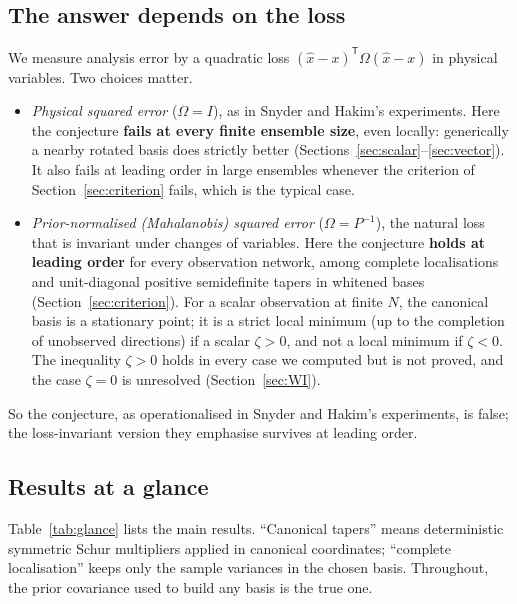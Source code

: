 \documentclass[11pt,a4paper]{article}
\numberwithin{equation}{section}
\theoremstyle{remark}\newtheorem{remark}[theorem]{Remark}
\newcommand{\T}{^{\mathsf T}}
\begin{document}
\subsection{The answer depends on the loss}\label{sec:losses}

We measure analysis error by a quadratic loss \((\hat x-x)\T\Omega(\hat x-x)\) in physical
variables. Two choices matter.
\begin{itemize}
\item \emph{Physical squared error} (\(\Omega=I\)), as in Snyder and Hakim's experiments. Here the
 conjecture \textbf{fails at every finite ensemble size}, even locally: generically a nearby
 rotated basis does strictly better (Sections~\ref{sec:scalar}--\ref{sec:vector}). It also
 fails at leading order in large ensembles whenever the criterion of
 Section~\ref{sec:criterion} fails, which is the typical case.
\item \emph{Prior-normalised (Mahalanobis) squared error} (\(\Omega=P^{-1}\)), the natural
 loss that is invariant under changes of variables. Here the conjecture \textbf{holds at
 leading order} for every observation network, among complete localisations and
 unit-diagonal positive semidefinite tapers in whitened bases (Section~\ref{sec:criterion}).
 For a scalar observation at finite \(N\), the canonical basis is a stationary point; it is a
 strict local minimum (up to the completion of unobserved directions) if a scalar
 \(\zeta>0\), and not a local minimum if \(\zeta<0\). The inequality \(\zeta>0\) holds in every
 case we computed but is not proved, and the case \(\zeta=0\) is unresolved
 (Section~\ref{sec:WI}).
\end{itemize}
So the conjecture, as operationalised in Snyder and Hakim's experiments, is false; the
loss-invariant version they emphasise survives at leading order.

\subsection{Results at a glance}

Table~\ref{tab:glance} lists the main results. ``Canonical tapers'' means deterministic
symmetric Schur multipliers applied in canonical coordinates; ``complete localisation'' keeps
only the sample variances in the chosen basis. Throughout, the prior covariance used to build
any basis is the true one.
\end{document}
